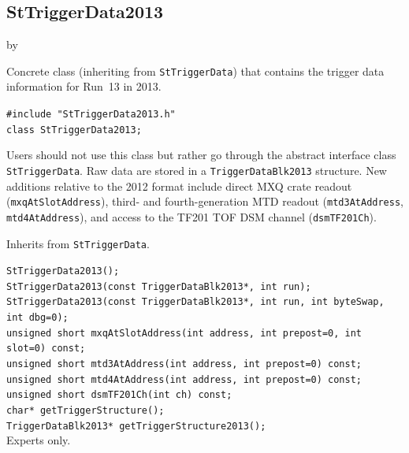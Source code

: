 \documentclass[twoside]{article}
\newcommand{\entrylabel}[1]{\mbox{\textbf{{#1}}}\hfil}%
\newenvironment{entry}
{\begin{list}{}%
    {\renewcommand{\makelabel}{\entrylabel}%
     \setlength{\labelwidth}{90pt}%
     \setlength{\leftmargin}{\labelwidth}
     \advance\leftmargin by \labelsep%
      }%
    }%
  {\end{list}}
\newcommand{\Entrylabel}[1]%
{\raisebox{0pt}[1ex][0pt]{\makebox[\labelwidth][l]%
    {\parbox[t]{\labelwidth}{\hspace{0pt}\textbf{{#1}}}}}}
\newenvironment{Entry}%
{\renewcommand{\entrylabel}{\Entrylabel}\begin{entry}}%
  {\end{entry}}
\begin{document}
\subsection{StTriggerData2013}
\label{sec:StTriggerData2013}
\begin{Entry}
\item[Summary] Concrete class (inheriting from \texttt{StTriggerData}) that
    contains the trigger data information for Run~13 in 2013.
\item[Synopsis]
    \verb+#include "StTriggerData2013.h"+\\
    \verb+class StTriggerData2013;+\\
\item[Description] Users should not use this class but rather go through the
    abstract interface class \texttt{StTriggerData}.  Raw data are stored in a
    \verb+TriggerDataBlk2013+ structure.  New additions relative to the 2012
    format include direct MXQ crate readout (\verb+mxqAtSlotAddress+), third-
    and fourth-generation MTD readout (\verb+mtd3AtAddress+, \verb+mtd4AtAddress+),
    and access to the TF201 TOF DSM channel (\verb+dsmTF201Ch+).
\item[Related Classes] Inherits from \texttt{StTriggerData}.
\item[Public\\ Constructors]
    \verb+StTriggerData2013();+\\
    \verb+StTriggerData2013(const TriggerDataBlk2013*, int run);+\\
    \verb+StTriggerData2013(const TriggerDataBlk2013*, int run, int byteSwap, int dbg=0);+\\
    \verb+unsigned short mxqAtSlotAddress(int address, int prepost=0, int slot=0) const;+\\
    \verb+unsigned short mtd3AtAddress(int address, int prepost=0) const;+\\
    \verb+unsigned short mtd4AtAddress(int address, int prepost=0) const;+\\
    \verb+unsigned short dsmTF201Ch(int ch) const;+\\
    \verb+char* getTriggerStructure();+\\
    \verb+TriggerDataBlk2013* getTriggerStructure2013();+\\
    Experts only.
\end{Entry}
\clearpage
\end{document}
